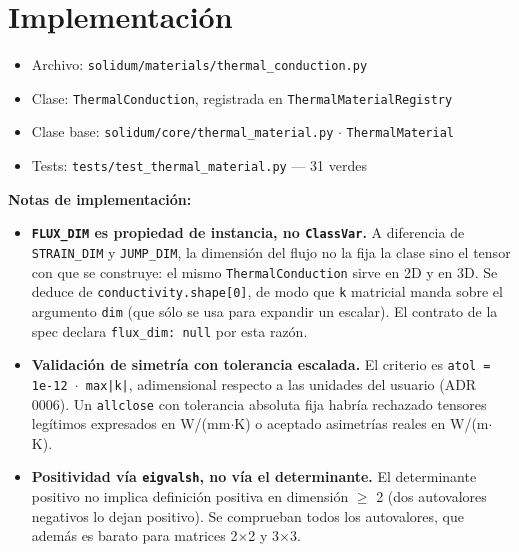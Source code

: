 \documentclass[11pt,letterpaper,oneside]{report}
\begin{document}
\section{Implementación}

\begin{itemize}
  \item Archivo: \texttt{solidum/materials/thermal\_conduction.py}
  \item Clase: \texttt{ThermalConduction}, registrada en \texttt{ThermalMaterialRegistry}
  \item Clase base: \texttt{solidum/core/thermal\_material.py} \ensuremath{\cdot} \texttt{ThermalMaterial}
  \item Tests: \texttt{tests/test\_thermal\_material.py} --- 31 verdes
\end{itemize}

\textbf{Notas de implementación:}

\begin{itemize}
  \item \textbf{\texttt{FLUX\_DIM} es propiedad de instancia, no \texttt{ClassVar}.} A diferencia de \texttt{STRAIN\_DIM} y \texttt{JUMP\_DIM}, la dimensión del flujo no la fija la clase sino el tensor con que se construye: el mismo \texttt{ThermalConduction} sirve en 2D y en 3D. Se deduce de \texttt{conductivity.shape[0]}, de modo que \texttt{k} matricial manda sobre el argumento \texttt{dim} (que sólo se usa para expandir un escalar). El contrato de la spec declara \texttt{flux\_dim: null} por esta razón.
\end{itemize}

\begin{itemize}
  \item \textbf{Validación de simetría con tolerancia escalada.} El criterio es \texttt{atol = 1e-12 \ensuremath{\cdot} max|k|}, adimensional respecto a las unidades del usuario (ADR 0006). Un \texttt{allclose} con tolerancia absoluta fija habría rechazado tensores legítimos expresados en W/(mm\ensuremath{\cdot}K) o aceptado asimetrías reales en W/(m\ensuremath{\cdot}K).
\end{itemize}

\begin{itemize}
  \item \textbf{Positividad vía \texttt{eigvalsh}, no vía el determinante.} El determinante positivo no implica definición positiva en dimensión \ensuremath{\ge} 2 (dos autovalores negativos lo dejan positivo). Se comprueban todos los autovalores, que además es barato para matrices 2\ensuremath{\times}2 y 3\ensuremath{\times}3.
\end{itemize}
\end{document}

